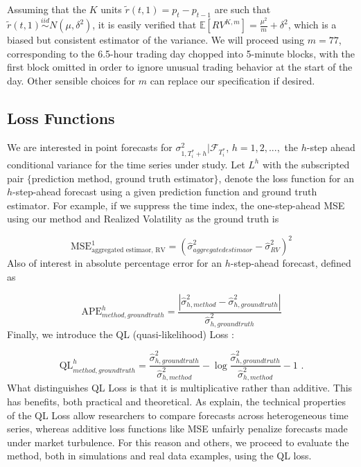 \documentclass[11pt,3p,review,authoryear]{elsarticle}
\newcommand{\simiid}{\stackrel{iid}{\sim}} %
\def\E{\mathbb{E}} %
\theoremstyle{definition}
\begin{document}
    Assuming that the $K$ units $\tilde{r}(t, 1) = p_{t} - p_{t-1}$ are such that $\tilde{r}(t, 1) \simiid N(\mu, \delta^{2})$, it is easily verified that $\E[RV^{K,m}] = \frac{\mu^{2}}{m} + \delta^{2}$, which is a biased but consistent estimator of the variance.  We will proceed using $m = 77$, corresponding to the 6.5-hour trading day chopped into 5-minute blocks, with the first block omitted in order to ignore unusual trading behavior at the start of the day. Other sensible choices for $m$ can replace our specification if desired.

\subsection{Loss Functions}\label{loss_function}

We are interested in point forecasts for $\sigma^{2}_{1,T_{i}^{*}+h}|\mathcal{F}_{T_{i}^{*}}$, $h=1,2,...,$ the $h$-step ahead conditional variance for the time series under study.  Let $L^{h}$ with the subscripted pair $\{$prediction method, ground truth estimator$\}$, denote the loss function for an $h$-step-ahead forecast using a given prediction function and ground truth estimator.  For example, if we suppress the time index, the one-step-ahead MSE using our method and Realized Volatility as the ground truth is

$$ \text{MSE}^{1}_{\text{aggregated estimaor, RV}} = (\hat\sigma^{2}_{aggregated estimaor} - \hat\sigma^{2}_{RV})^{2}$$
Also of interest in absolute percentage error for an $h$-step-ahead forecast, defined as

\[ 
\text{APE}^{h}_{method, ground truth} = \frac{|\hat\sigma^{2}_{h, method} - \hat\sigma^{2}_{h, ground truth}|}{\hat\sigma^{2}_{h, ground truth}}
\]
Finally, we introduce the QL (quasi-likelihood) Loss \citep{brownlees2011practical}:

\[ 
\text{QL}^{h}_{method, ground truth} = \frac{\hat\sigma^{2}_{h, ground truth}}{ \hat\sigma^{2}_{h, method}} - \log{\frac{\hat\sigma^{2}_{h, ground truth}}{ \hat\sigma^{2}_{h, method}}} -1 \text{ .}
\]
What distinguishes QL Loss is that it is multiplicative rather than additive.  This has benefits, both practical and theoretical.  As \citet{brownlees2011practical} explain, the technical properties of the QL Loss allow researchers to compare forecasts across heterogeneous time series, whereas additive loss functions like MSE unfairly penalize forecasts made under market turbulence.  For this reason and others, we proceed to evaluate the method, both in simulations and real data examples, using the QL loss.
\end{document}
